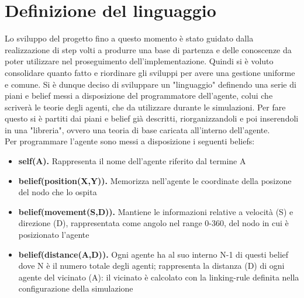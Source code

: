 \documentclass[12pt,a4paper,openright,twoside]{report}
\begin{document}
\section{Definizione del linguaggio}
Lo sviluppo del progetto fino a questo momento \`e stato guidato dalla realizzazione di step volti a produrre una base di partenza e delle conoscenze da poter utilizzare nel proseguimento dell'implementazione.
Quindi si \`e voluto consolidare quanto fatto e riordinare gli sviluppi per avere una gestione uniforme e comune. Si \`e dunque deciso di sviluppare un "linguaggio" definendo una serie di piani e belief messi a disposizione del programmatore dell'agente, colui che scriver\`a le teorie degli agenti, che da utilizzare durante le simulazioni. Per fare questo si \`e partiti dai piani e belief gi\`a descritti, riorganizzandoli e poi inserendoli in una "libreria", ovvero una teoria di base caricata all'interno dell'agente.
\\
Per programmare l'agente sono messi a disposizione i seguenti beliefs:
\begin{itemize}
   \item \textbf{self(A).} Rappresenta il nome dell'agente riferito dal termine A
   \item \textbf{belief(position(X,Y)).} Memorizza nell'agente le coordinate della posizone del nodo che lo ospita
   \item \textbf{belief(movement(S,D)).} Mantiene le informazioni relative a velocit\`a (S) e direzione (D), rappresentata come angolo nel range 0-360, del nodo in cui \`e posizionato l'agente
   \item \textbf{belief(distance(A,D)).} Ogni agente ha al suo interno N-1 di questi belief dove N \`e il numero totale degli agenti; rappresenta la distanza (D) di ogni agente del vicinato (A): il vicinato \`e calcolato con la linking-rule definita nella configurazione della simulazione
\end{itemize}
\end{document}
